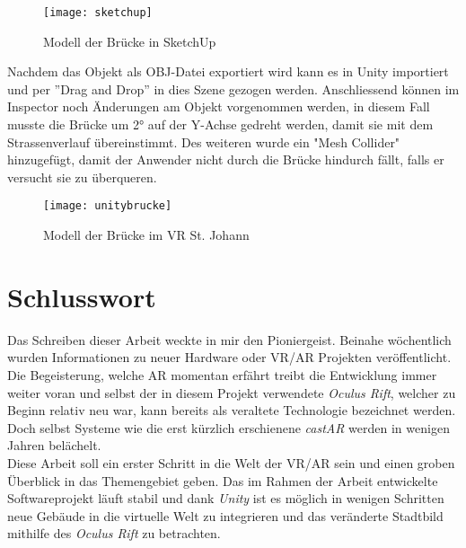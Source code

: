 \begin{figure}[ht]
	\vspace{-20pt}
	\begin{center}
		\texttt{[image: sketchup]}
	\end{center}
	\vspace{-15pt}
	\caption{Modell der Brücke in SketchUp}\label{sketchup}
	\vspace{-12pt}
\end{figure}

 Nachdem das Objekt als OBJ-Datei exportiert wird kann es in Unity importiert und per ''Drag and Drop'' in dies Szene gezogen werden. Anschliessend können im Inspector noch Änderungen am Objekt vorgenommen werden, in diesem Fall musste die Brücke um 2° auf der Y-Achse gedreht werden, damit sie mit dem Strassenverlauf übereinstimmt. Des weiteren wurde ein "Mesh Collider" hinzugefügt, damit der Anwender nicht durch die Brücke hindurch fällt, falls er versucht sie zu überqueren.\\[6pt]
 
 \begin{figure}[ht]
 	\vspace{-20pt}
 	\begin{center}
 		\texttt{[image: unitybrucke]}
 	\end{center}
 	\vspace{-15pt}
 	\caption{Modell der Brücke im VR St. Johann}\label{unitybrücke}
 	\vspace{-12pt}
 \end{figure}

\chapter{Schlusswort}\label{c.zusammenfassung}
\vspace{-20pt}
Das Schreiben dieser Arbeit weckte in mir den Pioniergeist. Beinahe wöchentlich wurden Informationen zu neuer Hardware oder VR/AR Projekten veröffentlicht. Die Begeisterung, welche AR momentan erfährt treibt die Entwicklung immer weiter voran und selbst der in diesem Projekt verwendete \textit{Oculus Rift}, welcher zu Beginn relativ neu war, kann bereits als veraltete Technologie bezeichnet werden. Doch selbst Systeme wie die erst kürzlich erschienene \textit{castAR} werden in wenigen Jahren belächelt.\\[6pt] 
Diese Arbeit soll ein erster Schritt in die Welt der VR/AR sein und einen groben Überblick in das Themengebiet geben. Das im Rahmen der Arbeit entwickelte Softwareprojekt läuft stabil und dank \textit{Unity} ist es möglich in wenigen Schritten neue Gebäude in die virtuelle Welt zu integrieren und das veränderte Stadtbild mithilfe des \textit{Oculus Rift} zu betrachten.
